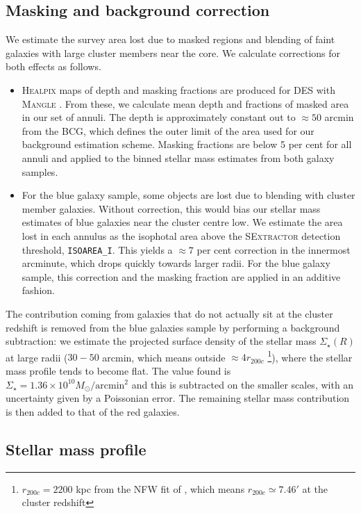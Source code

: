 {\subsection{Masking and background correction}

We estimate the survey area lost due to masked regions and blending of faint galaxies with large cluster members near the core. We calculate corrections for both effects as follows.
\begin{itemize}
\item \textsc{Healpix} \citep{healpix} maps of depth and masking fractions are produced for DES with \textsc{Mangle}
\citep{mangle}. From these, we calculate mean depth and fractions of masked area in our set of annuli. The depth is approximately constant out to $\approx 50$ arcmin from the BCG, which defines the outer limit of the area used for our background estimation scheme. Masking fractions are below 5 per cent for all annuli and applied to the binned stellar mass estimates from both galaxy samples.
\item For the blue galaxy sample, some objects are lost due to blending with cluster member galaxies. Without correction, this would bias our stellar mass estimates of blue galaxies near the cluster centre low. We estimate the area lost in each annulus as the isophotal area above the \textsc{SExtractor} detection threshold,
\texttt{ISOAREA\_I}. This yields a $\approx 7$ per cent correction in the innermost arcminute, which drops quickly towards larger radii. For the blue galaxy sample, this correction and the masking fraction are applied in an additive fashion.
\end{itemize}

The contribution coming from galaxies that do not actually sit at the cluster redshift is removed from the blue galaxies sample by performing a background subtraction: we estimate the projected surface density of the stellar mass $\Sigma_\star(R)$ at large radii ($30-50$ arcmin, which means outside $\approx 4r_{200c}$ \footnote{$r_{200c}=2200$ kpc from the NFW fit of \citet{melchior}, which means $r_{200c}\simeq7.46'$ at the cluster redshift}), where the stellar mass profile tends to become flat. The value found is $\Sigma_\star=1.36\times 10^{10} M_\odot/\textrm{arcmin}^2$ and this is subtracted on the smaller scales, with an uncertainty given by a Poissonian error. The remaining stellar mass contribution is then added to that of the red galaxies. 


\subsection{Stellar mass profile}

}
